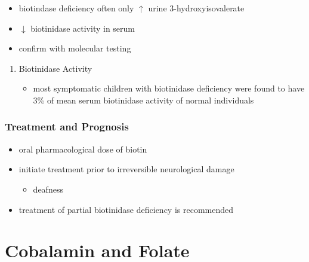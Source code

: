 \documentclass{scrartcl}
\begin{document}
\begin{itemize}
\item biotindase deficiency often only \(\uparrow\) urine 3-hydroxyisovalerate
\item \(\downarrow\) biotinidase activity in serum
\item confirm with molecular testing
\end{itemize}

\begin{enumerate}
\item Biotinidase Activity
\label{sec:orgf9b8a7b}
\begin{itemize}
\item most symptomatic children with biotinidase deficiency were found to
have 3\% of mean serum biotinidase activity of normal individuals
\end{itemize}
\end{enumerate}

\subsubsection{Treatment and Prognosis}
\label{sec:org66573e8}
\begin{itemize}
\item oral pharmacological dose of biotin
\item initiate treatment prior to irreversible neurological damage
\begin{itemize}
\item deafness
\end{itemize}
\item treatment of partial biotinidase deficiency is recommended
\end{itemize}

\section{Cobalamin and Folate}
\label{sec:orgbc5f696}
\end{document}
